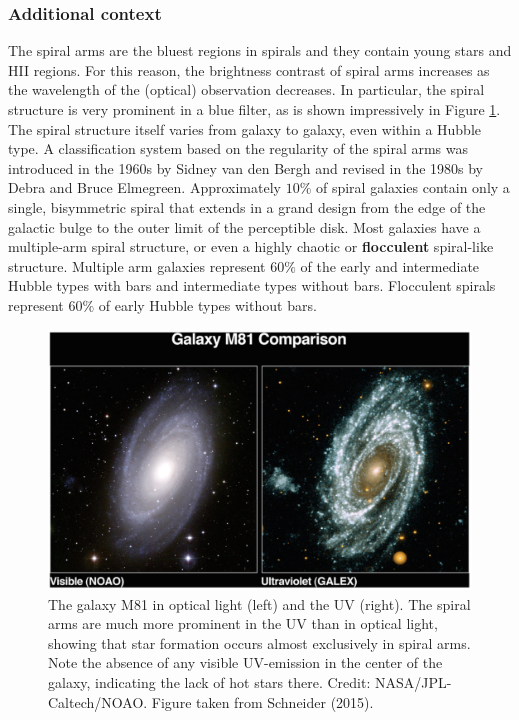 \documentclass[a4paper,10pt]{article}
\begin{document}
\subsubsection{Additional context}

{\noindent}The spiral arms are the bluest regions in spirals and they contain young stars and HII regions. For this reason, the brightness contrast of spiral arms increases as the wavelength of the (optical) observation decreases. In particular, the spiral structure is very prominent in a blue filter, as is shown impressively in Figure \ref{fig:m81spirals}. The spiral structure itself varies from galaxy to galaxy, even within a Hubble type. A classification system based on the regularity of the spiral arms was introduced in the 1960s by Sidney van den Bergh and revised in the 1980s by Debra and Bruce Elmegreen. Approximately $10\%$ of spiral galaxies contain only a single, bisymmetric spiral that extends in a grand design from the edge of the galactic bulge to the outer limit of the perceptible disk. Most galaxies have a multiple-arm spiral structure, or even a highly chaotic or \textbf{flocculent} spiral-like structure. Multiple arm galaxies represent $60\%$ of the early and intermediate Hubble types with bars and intermediate types without bars. Flocculent spirals represent $60\%$ of early Hubble types without bars.

\begin{figure}[h]
    \centering
    \includegraphics[width=14cm]{figures/M81_spirals.png}
    \caption{\footnotesize{The galaxy M81 in optical light (left) and the UV (right). The spiral arms are much more prominent in the UV than in optical light, showing that star formation occurs almost exclusively in spiral arms. Note the absence of any visible UV-emission in the center of the galaxy, indicating the lack of hot stars there. Credit: NASA/JPL-Caltech/NOAO. Figure taken from Schneider (2015).}}
    \label{fig:m81spirals}
\end{figure}
\end{document}
